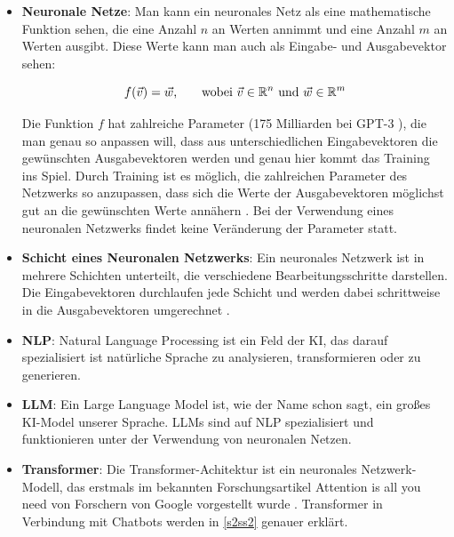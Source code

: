 	\begin{itemize}
		\item \textbf{Neuronale Netze}: Man kann ein neuronales Netz als eine mathematische Funktion sehen,
		die eine Anzahl $n$ an Werten annimmt und eine Anzahl $m$ an Werten ausgibt. Diese Werte kann man auch als Eingabe-
		und Ausgabevektor sehen: 		
		
		\begin{equation*}	
			f(\vec{v}) = \vec{w}\textnormal{,\qquad wobei } \vec{v} \in \mathbb{R}^n \textnormal{ und } \vec{w} \in \mathbb{R}^m
		\end{equation*}  
		\vspace{0.0cm}
		
		Die Funktion $f$ hat zahlreiche Parameter (175 Milliarden bei GPT-3 \cite[S. 8]{openAI2020}), die man genau so 
		anpassen will, dass aus unterschiedlichen Eingabevektoren die gewünschten Ausgabevektoren werden und genau hier kommt 
		das Training ins Spiel. Durch Training ist es möglich, die zahlreichen Parameter des Netzwerks so anzupassen, dass 
		sich die Werte der Ausgabevektoren möglichst gut an die gewünschten Werte annähern \cite[S. 127f]{nielsen2015}. Bei
		der Verwendung eines neuronalen Netzwerks findet keine Veränderung der Parameter statt.   

		\item \textbf{Schicht eines Neuronalen Netzwerks}: Ein neuronales Netzwerk ist in mehrere Schichten unterteilt, die verschiedene
		Bearbeitungsschritte darstellen. Die Eingabevektoren durchlaufen jede Schicht und werden dabei schrittweise in die Ausgabevektoren
		umgerechnet \cite[S. 4]{nielsen2015}. 
		
		\item \textbf{NLP}: Natural Language Processing ist ein Feld der KI, das darauf spezialisiert ist natürliche 
		Sprache zu analysieren, transformieren oder zu generieren.  
		
		\clearpage
		\item \textbf{LLM}: Ein Large Language Model ist, wie der Name schon sagt, ein großes KI-Model unserer Sprache.
		LLMs sind auf NLP spezialisiert und funktionieren unter der Verwendung von neuronalen Netzen.

		\item \textbf{Transformer}: Die Transformer-Achitektur ist ein neuronales Netzwerk-Modell, das erstmals im 
		bekannten Forschungsartikel \glqq{}Attention is all you need\grqq{} von Forschern von Google vorgestellt wurde 
		\cite{vaswani2017}. Transformer in Verbindung mit Chatbots werden in \ref{s2ss2} genauer erklärt.
		

\end{itemize}
